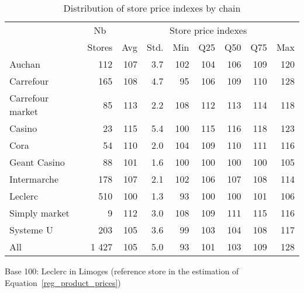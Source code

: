 \documentclass[english]{article}
\begin{document}
\begin{table}[htbp]
\caption{Distribution of store price indexes by chain}
\label{tab:store_price_indexes}
\begin{threeparttable}
    \begin{tabular}{lr|rrrrrrr}
    \toprule
    \toprule
          & \multicolumn{1}{c|}{Nb} & \multicolumn{7}{c}{Store price indexes} \\
          & \multicolumn{1}{c|}{Stores} & \multicolumn{1}{c}{Avg} & \multicolumn{1}{c}{Std.} & \multicolumn{1}{c}{Min} & \multicolumn{1}{c}{Q25} & \multicolumn{1}{c}{Q50} & \multicolumn{1}{c}{Q75} & \multicolumn{1}{c}{Max} \\
    \midrule
    Auchan & 112   & 107   & 3.7   & 102   & 104   & 106   & 109   & 120 \\
    Carrefour & 165   & 108   & 4.7   & 95    & 106   & 109   & 110   & 128 \\
    Carrefour market & 85    & 113   & 2.2   & 108   & 112   & 113   & 114   & 118 \\
    Casino & 23    & 115   & 5.4   & 100   & 115   & 116   & 118   & 123 \\
    Cora  & 54    & 110   & 2.0   & 104   & 109   & 110   & 111   & 116 \\
    Geant Casino & 88    & 101   & 1.6   & 100   & 100   & 100   & 100   & 105 \\
    Intermarche & 178   & 107   & 2.1   & 102   & 106   & 107   & 108   & 114 \\
    Leclerc & 510   & 100   & 1.3   & 93    & 100   & 100   & 101   & 106 \\
    Simply market & 9     & 112   & 3.0   & 108   & 109   & 111   & 115   & 116 \\
    Systeme U & 203   & 105   & 3.6   & 99    & 103   & 104   & 108   & 117 \\
    \midrule
    All   & 1 427 & 105   & 5.0   & 93    & 101   & 103   & 109   & 128 \\
    \bottomrule
    \bottomrule
    \end{tabular}
\begin{tablenotes}
      \small
      \item Base 100: Leclerc in Limoges (reference store in the estimation of Equation~\ref{reg_product_prices})
\end{tablenotes}
\end{threeparttable}
\end{table}
\end{document}
